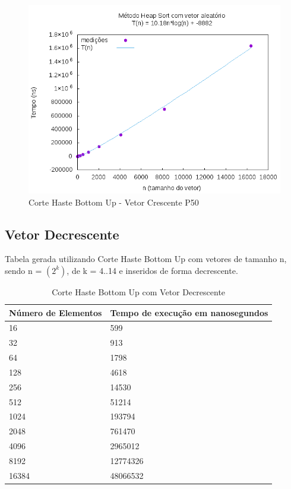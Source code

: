 \documentclass[12pt,a4paper,twoside]{report}
\begin{document}
\begin{figure}[H]
    \centering
    \includegraphics[width=0.7\linewidth]{graficos/HeapSort/vIntAleatorio/vIntAleatorio.png}
  \caption{Corte Haste Bottom Up - Vetor Crescente P50}
\end{figure}







\subsection{Vetor Decrescente}
Tabela gerada utilizando Corte Haste Bottom Up com vetores de tamanho n, sendo n = $(2^k)$, de k = 4..14 e inseridos de forma decrescente.
\begin{table}[H]
\centering
\caption{Corte Haste Bottom Up com Vetor Decrescente}
\label{my-label}
\begin{tabular}{|l|l|}
\hline
\multicolumn{1}{|c|}{\textbf{Número de Elementos}} & \multicolumn{1}{c|}{\textbf{Tempo de execução em nanosegundos}} \\ \hline
16 & 599 \\ \hline
32 & 913 \\ \hline
64 & 1798 \\ \hline
128 & 4618 \\ \hline
256 & 14530 \\ \hline
512 & 51214 \\ \hline
1024 & 193794 \\ \hline
2048 & 761470 \\ \hline
4096 & 2965012 \\ \hline
8192 & 12774326 \\ \hline
16384 & 48066532 \\ \hline
\end{tabular}
\end{table}
\end{document}

